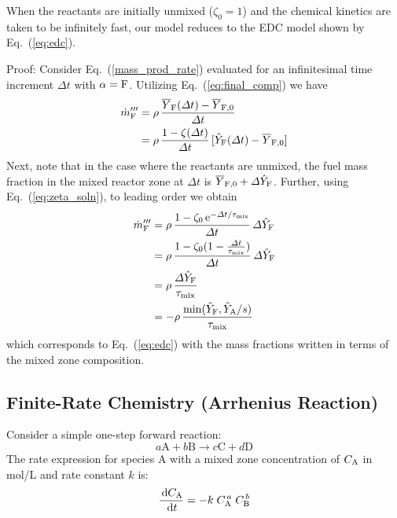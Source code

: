 When the reactants are initially unmixed ($\zeta_0=1$) and the chemical kinetics are taken to be infinitely fast, our model reduces to the EDC model shown by Eq.~(\ref{eq:edc}).

{Proof:} Consider Eq.~(\ref{mass_prod_rate}) evaluated for an infinitesimal time increment $\Delta t$ with $\alpha={\rm F}$.  Utilizing Eq.~(\ref{eq:final_comp}) we have
\begin{align}
\label{eq:edcproof1}
\dot{m}^{\prime\prime\prime}_{\rm F} &= \rho \, \frac{\overline{Y}_{\rm F}(\Delta t) - \overline{Y}_{\rm F,0}}{\Delta t} \notag\\
&=\rho \, \frac{1-\zeta(\Delta t)}{\Delta t} \, [\hat{Y}_{\rm F}(\Delta t) - \overline{Y}_{\rm F,0}] 
\end{align}
Next, note that in the case where the reactants are unmixed, the fuel mass fraction in the mixed reactor zone at $\Delta t$ is $\overline{Y}_{\rm F,0} + \Delta \hat{Y}_{\rm F}$.  Further, using Eq.~(\ref{eq:zeta_soln}), to leading order we obtain
\begin{align}
\dot{m}^{\prime\prime\prime}_{\rm F}
&= \rho \, \frac{1-\zeta_0 \, {\rm e}^{-\Delta t/\tau_{\rm mix}}}{\Delta t} \, \Delta \hat{Y}_{\rm F} \notag \\
&= \rho \, \frac{1-\zeta_0 (1 - \frac{\Delta t}{\tau_{\rm mix}})}{\Delta t} \, \Delta \hat{Y}_{\rm F} \notag \\
&= \rho \, \frac{\Delta \hat{Y}_{\rm F}}{\tau_{\rm mix}} \notag \\
&= - \rho \, \frac{ \min(\hat{Y}_{\rm F}, \hat{Y}_{\rm A}/s) }{ \tau_{\rm mix} }
\end{align}
which corresponds to Eq.~(\ref{eq:edc}) with the mass fractions written in terms of the mixed zone composition.


\subsection{Finite-Rate Chemistry (Arrhenius Reaction)}
\label{Reaction_Rate_Model}
Consider a simple one-step forward reaction:
\begin{equation}\label{eq:generic_1step}
a\mathrm{A} + b\mathrm{B} \rightarrow c\mathrm{C} + d\mathrm{D}
\end{equation}
The rate expression for species A with a mixed zone concentration of $C_{\mbox{\scriptsize A}}$ in mol/L and rate constant $k$ is:
\begin{equation}\label{eq:generic_rate}
\frac{\,\mathrm{d} C_{\mbox{\scriptsize A}}}{\,\mathrm{d} t}= -k\; C_{\mbox{\scriptsize A}}^{\,a}\; C_{\mbox{\scriptsize B}}^{\,b}
\end{equation}


